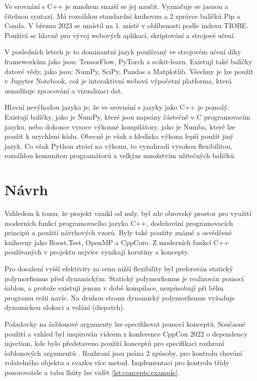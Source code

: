 Ve srovnání s C++ je mnohem snazší se jej naučit.
Vyznačuje se jasnou a čitelnou syntaxí.
Má rozsáhlou standardní knihovnu a 2 správce balíčků Pip a Conda.
V březnu 2023 se umístil na 1. místě v oblíbenosti podle indexu TIOBE.
Používá se hlavně pro vývoj webových aplikací, skriptování a strojové učení.

V posledních letech je to dominantní jazyk používaný ve strojovém učení díky frameworkům jako jsou: TensorFlow, PyTorch a scikit-learn.
Existují také balíčky datové vědy, jako jsou: NumPy, SciPy, Pandas a Matplotlib.
Všechny je lze použít v Jupyter Notebook, což je interaktivní webová výpočetní platforma, která usnadňuje zpracování a vizualizaci dat.

Hlavní nevýhodou jazyka je, že ve srovnání s jazyky jako C++ je pomalý.
Existují balíčky, jako je NumPy, které jsou napsány částečně v C programovacím jazyku, nebo dokonce vysoce výkonné kompilátory, jako je Numba, které lze použít k urychlení kódu.
Obecně je však z hlediska výkonu lepší použít jiný jazyk.
Co však Python ztrácí na výkonu, to vynahradí vysokou flexibilitou, rozsáhlou komunitou programátorů a velkým množstvím užitečných balíčků.

\chapter{Návrh}
Vzhledem k tomu, že projekt vznikl od nuly, byl zde obrovský prostor pro využití moderních funkcí programovacího jazyka C++, dodržování programovacích principů a použití návrhových vzorů.
Byly také použity známé a osvědčené knihovny jako Boost.Test, OpenMP a CppCoro.
Z moderních funkcí C++ používaných v projektu nejvíce vynikají korutiny a koncepty.

Pro dosažení vyšší efektivity za cenu nižší flexibility byl preferován statický polymorfismus před dynamickým.
Statický polymorfismus je realizován pomocí šablon, a protože existují jenom v době kompilace, nezpůsobují při běhu programu režii navíc.
Na druhou stranu dynamický polymorfismus vyžaduje dynamickou alokaci a volání (dispatch).

Požadavky na šablonové argumenty lze specifikovat pomocí konceptů.
Současné použití a vzhled byl inspirován videem z konference CppCon 2022 o dependency injection, kde bylo představeno použití konceptů pro specifikaci rozhraní šablonových argumentů \cite{zoffoli}.
Rozhraní jsou psána 2 způsoby, pro kontrolu chování volatelného objektu a svazku více metod.
Implementaci pro kontrolu třídy pozorovatele a tabu lhůty lze vidět \ref{lst:concepts:example}.

